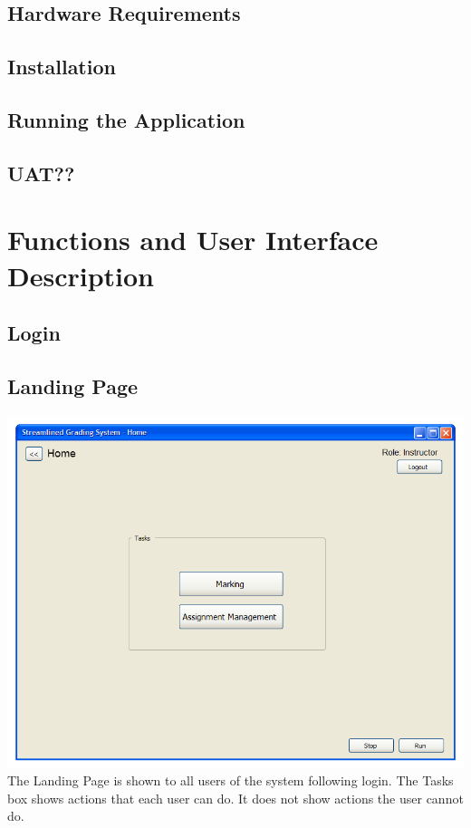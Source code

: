 \documentclass{article}
\begin{document}
\subsection{Hardware Requirements}

\subsection{Installation}

\subsection{Running the Application}

\subsection{UAT??}

\section{Functions and User Interface Description}  %
\subsection{Login}

\subsection{Landing Page}
\includegraphics[scale=0.6]{../images/UIMockups/PNG_Renders/LandingPage}
The Landing Page is shown to all users of the system following login.  The Tasks box shows actions that each user can do.  It does not show actions the user cannot do.
\end{document}
